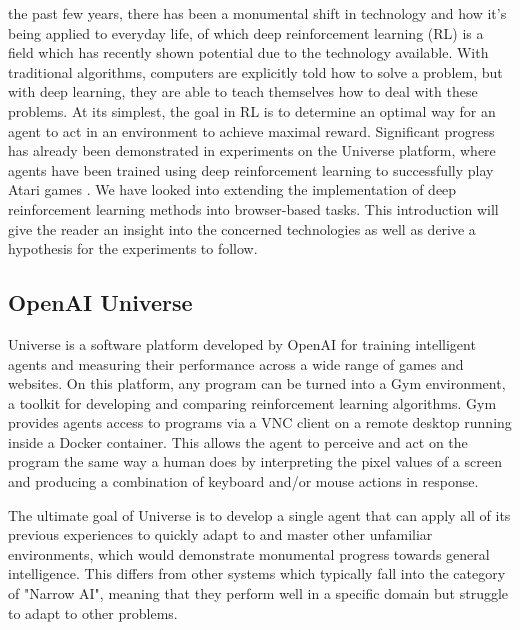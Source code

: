\documentclass[10pt,journal,compsoc]{IEEEtran}
\begin{document}
% 
% 
% 
% 
 the past few years, there has been a monumental shift in technology and how it's being applied to everyday life, of which deep reinforcement learning (RL) is a field which has recently shown potential due to the technology available. With traditional algorithms, computers are explicitly told how to solve a problem, but with deep learning, they are able to teach themselves how to deal with these problems. At its simplest, the goal in RL is to determine an optimal way for an agent to act in an environment to achieve maximal reward. Significant progress has already been demonstrated in experiments on the Universe platform, where agents have been trained using deep reinforcement learning to successfully play Atari games \cite{mnih2013playing}. We have looked into extending the implementation of deep reinforcement learning methods into browser-based tasks. This introduction will give the reader an insight into the concerned technologies as well as derive a hypothesis for the experiments to follow.

\subsection{OpenAI Universe}
Universe is a software platform developed by OpenAI for training intelligent agents and measuring their performance across a wide range of games and websites. On this platform, any program can be turned into a Gym environment, a toolkit for developing and comparing reinforcement learning algorithms. Gym provides agents access to programs via a VNC client on a remote desktop running inside a Docker container. This allows the agent to perceive and act on the program the same way a human does by interpreting the pixel values of a screen and producing a combination of keyboard and/or mouse actions in response.

The ultimate goal of Universe is to develop a single agent that can apply all of its previous experiences to quickly adapt to and master other unfamiliar environments, which would demonstrate monumental progress towards general intelligence. This differs from other systems which typically fall into the category of "Narrow AI", meaning that they perform well in a specific domain but struggle to adapt to other problems.
\end{document}

